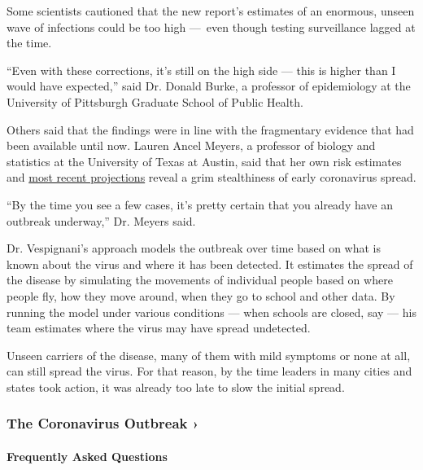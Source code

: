 Some scientists cautioned that the new report's estimates of an
enormous, unseen wave of infections could be too high ---~even though
testing surveillance lagged at the time.

``Even with these corrections, it's still on the high side --- this is
higher than I would have expected,'' said Dr. Donald Burke, a professor
of epidemiology at the University of Pittsburgh Graduate School of
Public Health.

Others said that the findings were in line with the fragmentary evidence
that had been available until now. Lauren Ancel Meyers, a professor of
biology and statistics at the University of Texas at Austin, said that
her own risk estimates and
\href{https://covid-19.tacc.utexas.edu/projections/}{most recent
projections} reveal a grim stealthiness of early coronavirus spread.

``By the time you see a few cases, it's pretty certain that you already
have an outbreak underway,'' Dr. Meyers said.

Dr. Vespignani's approach models the outbreak over time based on what is
known about the virus and where it has been detected. It estimates the
spread of the disease by simulating the movements of individual people
based on where people fly, how they move around, when they go to school
and other data. By running the model under various conditions --- when
schools are closed, say --- his team estimates where the virus may have
spread undetected.

Unseen carriers of the disease, many of them with mild symptoms or none
at all, can still spread the virus. For that reason, by the time leaders
in many cities and states took action, it was already too late to slow
the initial spread.

\href{https://www.nytimes.com/news-event/coronavirus?action=click\&pgtype=Article\&state=default\&region=MAIN_CONTENT_3\&context=storylines_faq}{}

\hypertarget{the-coronavirus-outbreak-}{%
\subsubsection{The Coronavirus Outbreak
›}\label{the-coronavirus-outbreak-}}

\hypertarget{frequently-asked-questions}{%
\paragraph{Frequently Asked
Questions}\label{frequently-asked-questions}}

